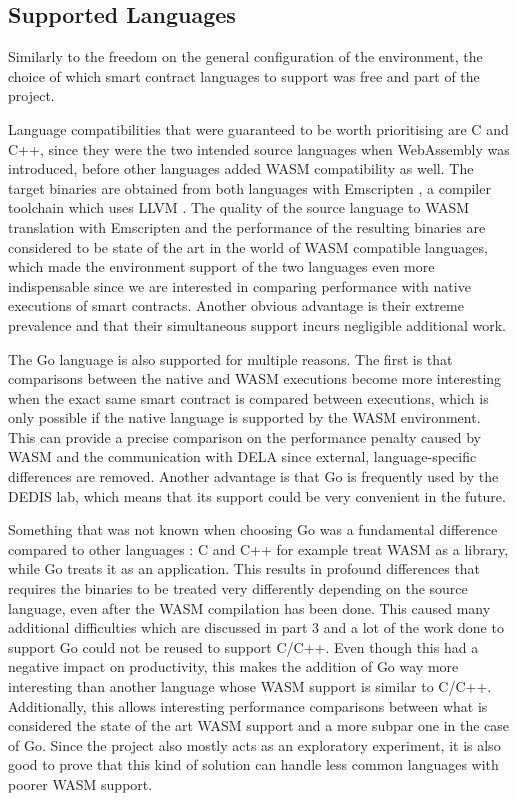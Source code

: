 \documentclass[11pt, a4paper, twoside, openright]{article}
\begin{document}
\subsection{Supported Languages}

Similarly to the freedom on the general configuration of the environment, the choice of which smart contract languages to support was free and part of the project.

Language compatibilities that were guaranteed to be worth prioritising are C and C++, since they were the two intended source languages when WebAssembly was introduced, before other languages added WASM compatibility as well. The target binaries are obtained from both languages with Emscripten \cite{emscripten}, a compiler toolchain which uses LLVM \cite{llvm}. The quality of the source language to WASM translation with Emscripten and the performance of the resulting binaries are considered to be state of the art in the world of WASM compatible languages, which made the environment support of the two languages even more indispensable since we are interested in comparing performance with native executions of smart contracts. Another obvious advantage is their extreme prevalence and that their simultaneous support incurs negligible additional work.

The Go language is also supported for multiple reasons. The first is that comparisons between the native and WASM executions become more interesting when the exact same smart contract is compared between executions, which is only possible if the native language is supported by the WASM environment. This can provide a precise comparison on the performance penalty caused by WASM and the communication with DELA since external, language-specific differences are removed. Another advantage is that Go is frequently used by the DEDIS lab, which means that its support could be very convenient in the future.

Something that was not known when choosing Go was a fundamental difference compared to other languages : C and C++ for example treat WASM as a library, while Go treats it as an application. This results in profound differences that requires the binaries to be treated very differently depending on the source language, even after the WASM compilation has been done. This caused many additional difficulties which are discussed in part 3 and a lot of the work done to support Go could not be reused to support C/C++. Even though this had a negative impact on productivity, this makes the addition of Go way more interesting than another language whose WASM support is similar to C/C++. Additionally, this allows interesting performance comparisons between what is considered the state of the art WASM support and a more subpar one in the case of Go. Since the project also mostly acts as an exploratory experiment, it is also good to prove that this kind of solution can handle less common languages with poorer WASM support.
\end{document}
